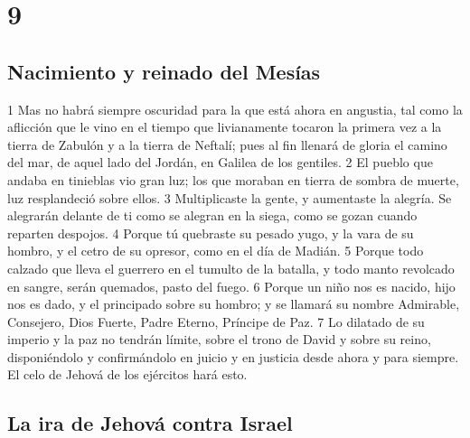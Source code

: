 \chapter{9}

\section*{Nacimiento y reinado del Mesías}

1 Mas no habrá siempre oscuridad para la que está ahora en angustia, tal como la aflicción que le vino en el tiempo que livianamente tocaron la primera vez a la tierra de Zabulón y a la tierra de Neftalí; pues al fin llenará de gloria el camino del mar, de aquel lado del Jordán, en Galilea de los gentiles. 
2 El pueblo que andaba en tinieblas vio gran luz; los que moraban en tierra de sombra de muerte, luz resplandeció sobre ellos. 
3 Multiplicaste la gente, y aumentaste la alegría. Se alegrarán delante de ti como se alegran en la siega, como se gozan cuando reparten despojos.
4 Porque tú quebraste su pesado yugo, y la vara de su hombro, y el cetro de su opresor, como en el día de Madián.
5 Porque todo calzado que lleva el guerrero en el tumulto de la batalla, y todo manto revolcado en sangre, serán quemados, pasto del fuego.
6 Porque un niño nos es nacido, hijo nos es dado, y el principado sobre su hombro; y se llamará su nombre Admirable, Consejero, Dios Fuerte, Padre Eterno, Príncipe de Paz.
7 Lo dilatado de su imperio y la paz no tendrán límite, sobre el trono de David y sobre su reino, disponiéndolo y confirmándolo en juicio y en justicia desde ahora y para siempre. El celo de Jehová de los ejércitos hará esto.

\section*{La ira de Jehová contra Israel}

